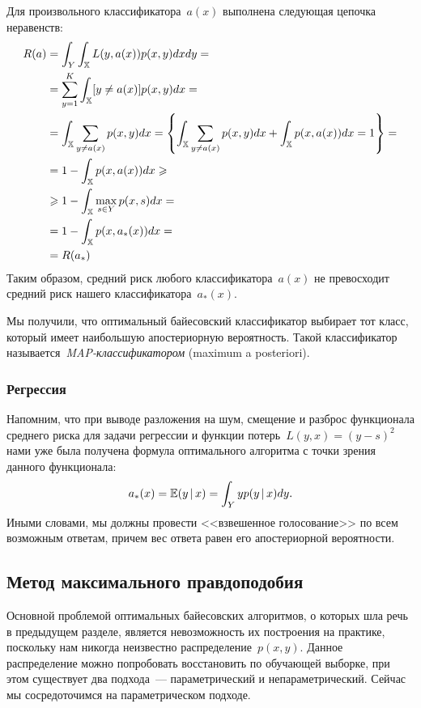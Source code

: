 \documentclass[12pt,fleqn]{article}
\begin{document}
Для произвольного классификатора~$a(x)$ выполнена
следующая цепочка неравенств:
\begin{align*}
    R(a)
    &=
    \int_{Y} \int_{\mathbb{X}} L(y, a(x)) p(x, y) dx dy
    =
    \\
    &=
    \sum_{y = 1}^{K} \int_{\mathbb{X}} [y \neq a(x)] p(x, y) dx
    =
    \\
    &=
    \int_{\mathbb{X}} \sum_{y \neq a(x)} p(x, y) dx
    =
    \left\{
    \int_{\mathbb{X}} \sum_{y \neq a(x)} p(x, y) dx
    +
    \int_{\mathbb{X}} p(x, a(x)) dx
    =
    1
    \right\}
    =
    \\
    &=
    1 - \int_{\mathbb{X}} p(x, a(x)) dx
    \geqslant\\
    &\geqslant
    1 - \int_{\mathbb{X}} \max_{s \in Y} p(x, s) dx
    =
    \\
    &=
    1 - \int_{\mathbb{X}} p(x, a_*(x)) dx
    =
    \\
    &=
    R(a_*)
\end{align*}
Таким образом, средний риск любого классификатора~$a(x)$
не превосходит средний риск нашего классификатора~$a_*(x)$.

Мы получили, что оптимальный байесовский классификатор
выбирает тот класс, который имеет наибольшую апостериорную вероятность.
Такой классификатор называется~\emph{MAP-классификатором} (maximum a posteriori).

\subsubsection{Регрессия}

Напомним, что при выводе разложения на шум, смещение и разброс функционала среднего риска для задачи регрессии и функции потерь~$L(y, x) = (y - s)^2$ нами уже была получена формула оптимального алгоритма с точки зрения данного функционала:
\[
    a_*(x) = \mathbb{E} (y \mspace{3mu}{|}\mspace{3mu} x)
    =
    \int_Y y p(y \mspace{3mu}{|}\mspace{3mu} x) dy.
\]
Иными словами, мы должны провести <<взвешенное голосование>>
по всем возможным ответам, причем вес ответа равен его
апостериорной вероятности.

\subsection{Метод максимального правдоподобия}

Основной проблемой оптимальных байесовских алгоритмов,
о которых шла речь в предыдущем разделе, является
невозможность их построения на практике, поскольку нам никогда
неизвестно распределение~$p(x, y)$.
Данное распределение можно попробовать восстановить по обучающей выборке,
при этом существует два подхода~--- параметрический и непараметрический.
Сейчас мы сосредоточимся на параметрическом подходе.
\end{document}
